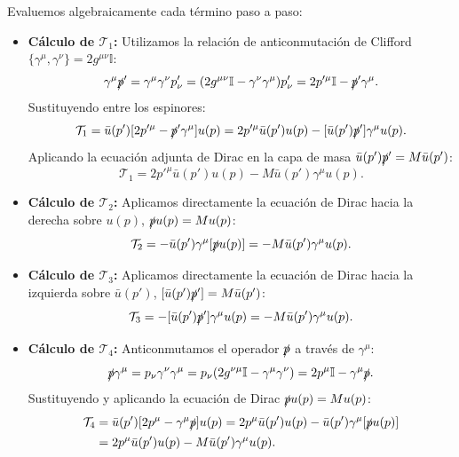 \documentclass[10pt,a4paper]{article}
\begin{document}
Evaluemos algebraicamente cada término paso a paso:
\begin{itemize}
    \item \textbf{Cálculo de $\mathcal{T}_1$:}
    Utilizamos la relación de anticonmutación de Clifford $\{\gamma^\mu, \gamma^\nu\} = 2g^{\mu\nu}\mathbb{I}$:
    \begin{equation}
    \gamma^\mu \slashed{p}' = \gamma^\mu \gamma^\nu p'_\nu = (2 g^{\mu\nu}\mathbb{I} - \gamma^\nu \gamma^\mu) p'_\nu = 2 p'^\mu \mathbb{I} - \slashed{p}' \gamma^\mu.
    \end{equation}
    Sustituyendo entre los espinores:
    \begin{equation}
    \mathcal{T}_1 = \bar{u}(p') [2 p'^\mu - \slashed{p}' \gamma^\mu] u(p) = 2 p'^\mu \bar{u}(p') u(p) - [\bar{u}(p') \slashed{p}'] \gamma^\mu u(p).
    \end{equation}
    Aplicando la ecuación adjunta de Dirac en la capa de masa $\bar{u}(p') \slashed{p}' = M \bar{u}(p')$:
    \begin{equation}
    \mathcal{T}_1 = 2 p'^\mu \bar{u}(p') u(p) - M \bar{u}(p') \gamma^\mu u(p).
    \label{eq:T1_eval}
    \end{equation}

    \item \textbf{Cálculo de $\mathcal{T}_2$:}
    Aplicamos directamente la ecuación de Dirac hacia la derecha sobre $u(p)$, $\slashed{p} u(p) = M u(p)$:
    \begin{equation}
    \mathcal{T}_2 = -\bar{u}(p') \gamma^\mu [\slashed{p} u(p)] = - M \bar{u}(p') \gamma^\mu u(p).
    \label{eq:T2_eval}
    \end{equation}

    \item \textbf{Cálculo de $\mathcal{T}_3$:}
    Aplicamos directamente la ecuación de Dirac hacia la izquierda sobre $\bar{u}(p')$, $[\bar{u}(p') \slashed{p}'] = M \bar{u}(p')$:
    \begin{equation}
    \mathcal{T}_3 = - [\bar{u}(p') \slashed{p}'] \gamma^\mu u(p) = - M \bar{u}(p') \gamma^\mu u(p).
    \label{eq:T3_eval}
    \end{equation}

    \item \textbf{Cálculo de $\mathcal{T}_4$:}
    Anticonmutamos el operador $\slashed{p}$ a través de $\gamma^\mu$:
    \begin{equation}
    \slashed{p} \gamma^\mu = p_\nu \gamma^\nu \gamma^\mu = p_\nu (2 g^{\nu\mu}\mathbb{I} - \gamma^\mu \gamma^\nu) = 2 p^\mu \mathbb{I} - \gamma^\mu \slashed{p}.
    \end{equation}
    Sustituyendo y aplicando la ecuación de Dirac $\slashed{p} u(p) = M u(p)$:
    \begin{align}
    \mathcal{T}_4 &= \bar{u}(p') [2 p^\mu - \gamma^\mu \slashed{p}] u(p) = 2 p^\mu \bar{u}(p') u(p) - \bar{u}(p') \gamma^\mu [\slashed{p} u(p)] \nonumber \\
    &= 2 p^\mu \bar{u}(p') u(p) - M \bar{u}(p') \gamma^\mu u(p).
    \label{eq:T4_eval}
    \end{align}
\end{itemize}
\end{document}
